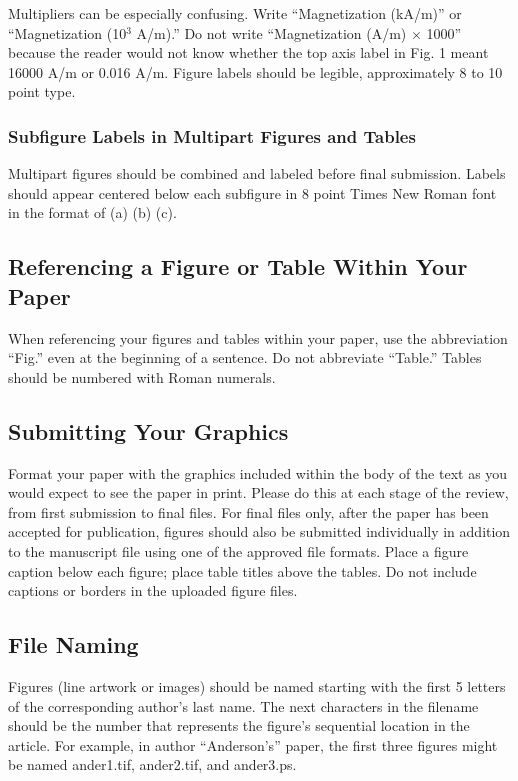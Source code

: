 \documentclass[journal,twoside,web]{ieeecolor}
\begin{document}
Multipliers can be especially confusing. Write ``Magnetization (kA/m)'' or 
``Magnetization (10$^{3}$ A/m).'' Do not write ``Magnetization 
(A/m)$\,\times\,$1000'' because the reader would not know whether the top 
axis label in Fig. 1 meant 16000 A/m or 0.016 A/m. Figure labels should be 
legible, approximately 8 to 10 point type.

\subsubsection{Subfigure Labels in Multipart Figures and Tables}
Multipart figures should be combined and labeled before final submission. 
Labels should appear centered below each subfigure in 8 point Times New 
Roman font in the format of (a) (b) (c).

\subsection{Referencing a Figure or Table Within Your Paper}
When referencing your figures and tables within your paper, use the 
abbreviation ``Fig.'' even at the beginning of a sentence. Do not abbreviate 
``Table.'' Tables should be numbered with Roman numerals.

\subsection{Submitting Your Graphics}
Format your paper with the graphics included within the body of the text
as you would expect to see the paper in print. Please do this at each stage of the review,
from first submission to final files. For final files only, after the paper has been accepted
for publication, figures should also be submitted individually in addition to the manuscript
file using one of the approved file formats. Place a figure caption below each figure;
place table titles above the tables. Do not include captions or borders in the uploaded figure files.

\subsection{File Naming}
Figures (line artwork or images) should be named starting with the 
first 5 letters of the corresponding author's last name. The next characters in the 
filename should be the number that represents the figure's sequential 
location in the article. For example, in author ``Anderson's'' paper,
the first three figures might be named ander1.tif, ander2.tif, and ander3.ps.
\end{document}
